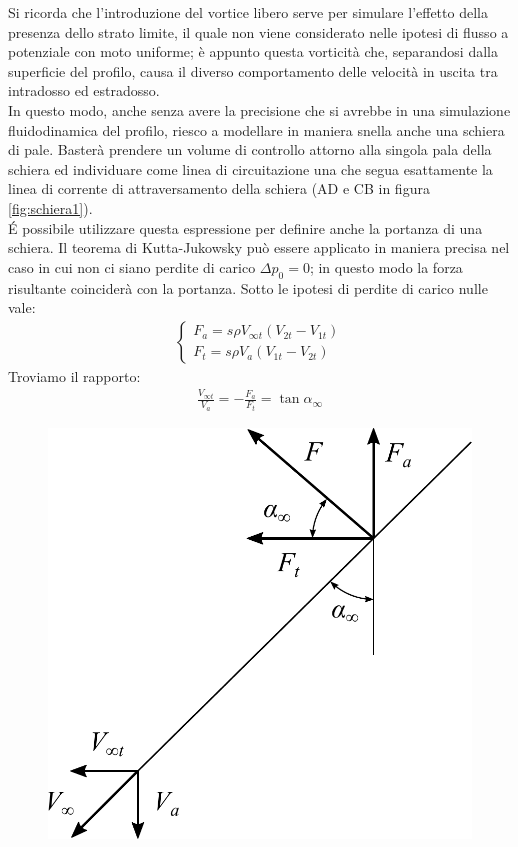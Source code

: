 Si ricorda che l'introduzione del vortice libero serve per simulare l'effetto della presenza dello strato limite, il quale non viene considerato nelle ipotesi di flusso a potenziale con moto uniforme; è appunto questa vorticità che, separandosi dalla superficie del profilo, causa il diverso comportamento delle velocità in uscita tra intradosso ed estradosso.\\
In questo modo, anche senza avere la precisione che si avrebbe in una simulazione fluidodinamica del profilo, riesco a modellare in maniera snella anche una schiera di pale. Basterà prendere un volume di controllo attorno alla singola pala della schiera ed individuare come linea di circuitazione una che segua esattamente la linea di corrente di attraversamento della schiera (AD e CB in figura \ref{fig:schiera1}).\\
\'E possibile utilizzare questa espressione per definire anche la portanza di una schiera. Il teorema di Kutta-Jukowsky può essere applicato in maniera precisa nel caso in cui non ci siano perdite di carico $\Delta p_0=0$; in questo modo la forza risultante coinciderà con la portanza. Sotto le ipotesi di perdite di carico nulle vale:
\begin{align*}
\begin{cases}
F_a = s \rho V_{\infty t} (V_{2t}-V_{1t})\\
F_t = s \rho V_a (V_{1t}-V_{2t})
\end{cases}
\end{align*}
Troviamo il rapporto:
\begin{align*}
	\frac{V_{\infty t}}{V_a}=-\frac{F_a}{F_t} = \tan \alpha_{\infty}
\end{align*}
\begin{figure}
	\centering
	\begin{minipage}{.4\textwidth}
		\centering
		\includegraphics[width=.95\linewidth]{fig/forzaKJ.pdf}
		\label{fig:forzaKJ}
	\end{minipage}
\end{figure}
